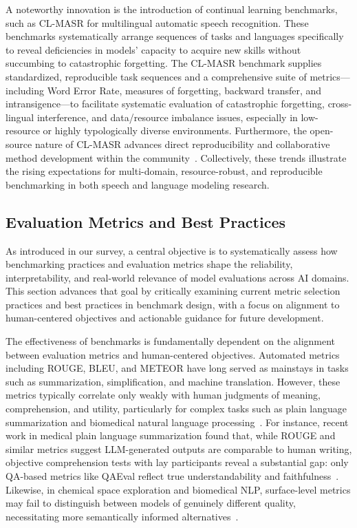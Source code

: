 \documentclass[sigconf]{acmart}
\begin{document}
A noteworthy innovation is the introduction of continual learning benchmarks, such as CL-MASR for multilingual automatic speech recognition. These benchmarks systematically arrange sequences of tasks and languages specifically to reveal deficiencies in models’ capacity to acquire new skills without succumbing to catastrophic forgetting. The CL-MASR benchmark supplies standardized, reproducible task sequences and a comprehensive suite of metrics—including Word Error Rate, measures of forgetting, backward transfer, and intransigence—to facilitate systematic evaluation of catastrophic forgetting, cross-lingual interference, and data/resource imbalance issues, especially in low-resource or highly typologically diverse environments. Furthermore, the open-source nature of CL-MASR advances direct reproducibility and collaborative method development within the community~\cite{ref102}. Collectively, these trends illustrate the rising expectations for multi-domain, resource-robust, and reproducible benchmarking in both speech and language modeling research.

\subsection{Evaluation Metrics and Best Practices}

As introduced in our survey, a central objective is to systematically assess how benchmarking practices and evaluation metrics shape the reliability, interpretability, and real-world relevance of model evaluations across AI domains. This section advances that goal by critically examining current metric selection practices and best practices in benchmark design, with a focus on alignment to human-centered objectives and actionable guidance for future development.

The effectiveness of benchmarks is fundamentally dependent on the alignment between evaluation metrics and human-centered objectives. Automated metrics including ROUGE, BLEU, and METEOR have long served as mainstays in tasks such as summarization, simplification, and machine translation. However, these metrics typically correlate only weakly with human judgments of meaning, comprehension, and utility, particularly for complex tasks such as plain language summarization and biomedical natural language processing~\cite{ref76,ref81,ref91,ref94,ref101,ref104,ref106}. For instance, recent work in medical plain language summarization found that, while ROUGE and similar metrics suggest LLM-generated outputs are comparable to human writing, objective comprehension tests with lay participants reveal a substantial gap: only QA-based metrics like QAEval reflect true understandability and faithfulness~\cite{ref81}. Likewise, in chemical space exploration and biomedical NLP, surface-level metrics may fail to distinguish between models of genuinely different quality, necessitating more semantically informed alternatives~\cite{ref91,ref94}.
\end{document}
